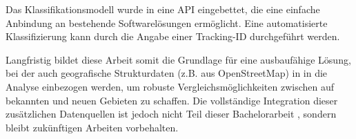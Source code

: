 \documentclass[a4paper,12pt,twoside]{scrreprt}
\begin{document}
Das Klassifikationsmodell wurde in eine API eingebettet, die eine einfache
Anbindung an bestehende Softwarelösungen ermöglicht. Eine automatisierte
Klassifizierung kann durch die Angabe einer
Tracking-ID durchgeführt werden.

Langfristig bildet diese Arbeit somit die Grundlage für eine ausbaufähige
Lösung, bei der auch geografische Strukturdaten (z.B. aus OpenStreetMap) in
in die Analyse einbezogen werden, um robuste Vergleichsmöglichkeiten zwischen
auf
bekannten und neuen Gebieten zu schaffen. Die vollständige Integration dieser
zusätzlichen Datenquellen ist jedoch nicht Teil dieser Bachelorarbeit
, sondern bleibt zukünftigen Arbeiten vorbehalten.

\end{document}
